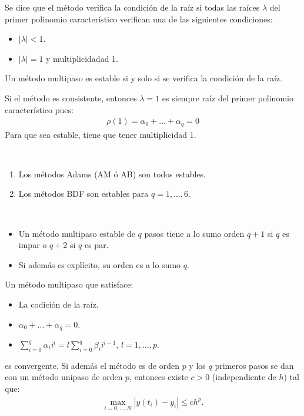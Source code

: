 \begin{defi}
    Se dice que el método verifica la condición de la raíz si todas las raíces $\lambda$ del primer polinomio característico verifican una de las siguientes condiciones:
    \begin{itemize}
        \item $|\lambda| < 1$.
        \item $|\lambda| = 1$ y multiplicidadad 1.
    \end{itemize}
\end{defi}

\begin{teo}
    Un método multipaso es estable si y solo si se verifica la condición de la raíz.
\end{teo}

\begin{obs}
    Si el método es consistente, entonces $\lambda = 1$ es siempre raíz del primer polinomio característico pues:
    \begin{align*}
        \rho(1) = \alpha_0 + \ldots + \alpha_q = 0
    \end{align*}
    Para que sea estable, tiene que tener multiplicidad 1.
\end{obs}

\begin{ejemplo} \
    \begin{enumerate}
        \item Los métodos Adams (AM ó AB) son todos estables.
        \item Los métodos BDF son estables para $q = 1,\ldots,6$.
    \end{enumerate}
\end{ejemplo}

\begin{teo} \
    \begin{itemize}
        \item Un método multipaso estable de $q$ pasos tiene a lo sumo orden $q+1$ si $q$ es impar o $q+2$ si $q$ es par.
        \item Si además es explícito, su orden es a lo sumo $q$.
    \end{itemize}
\end{teo}

\begin{teo}
    Un método multipaso que satisface:
    \begin{itemize}
        \item La codición de la raíz.
        \item $\alpha_0 + \ldots + \alpha_q = 0$.
        \item $\sum_{i=0}^{q} \alpha_i i^l = l\sum_{i=0}^{q} \beta_i i^{l-1}$, $l = 1,\ldots,p$.
    \end{itemize}
    es convergente. Si además el método es de orden $p$ y los $q$ primeros pasos se dan con un método unipaso de orden $p$, entonces existe $c > 0$ (independiente de $h$) tal que:
    \begin{align*}
        \max_{i=0,\ldots,N} |y(t_i) - y_i| \leq ch^p.
    \end{align*}
\end{teo}